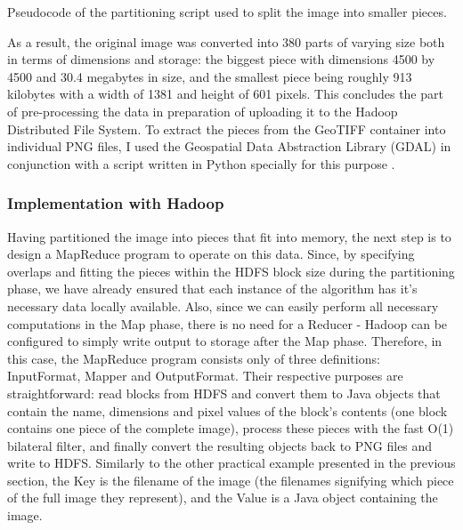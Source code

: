 \documentclass [12pt,a4paper]{report}
\begin{document}
\begin{center}
\begin{algorithm}[H]
\caption{Pseudocode of the partitioning script used to split the image into smaller pieces.}
\label{partitioning_algorithm}
\end{algorithm}
\end{center}

As a result, the original image was converted into 380 parts of varying size both in terms of dimensions and storage: the biggest piece with dimensions 4500 by 4500 and 30.4 megabytes in size, and the smallest piece being roughly 913 kilobytes with a width of 1381 and height of 601 pixels. This concludes the part of pre-processing the data in preparation of uploading it to the Hadoop Distributed File System.
To extract the pieces from the GeoTIFF container into individual PNG files, I used the Geospatial Data Abstraction Library (GDAL) in conjunction with a script written in Python specially for this purpose \cite{gdal}.

\subsubsection{Implementation with Hadoop}

Having partitioned the image into pieces that fit into memory, the next step is to design a MapReduce program to operate on this data. Since, by specifying overlaps and fitting the pieces within the HDFS block size during the partitioning phase, we have already ensured that each instance of the algorithm has it's necessary data locally available. Also, since we can easily perform all necessary computations in the Map phase, there is no need for a Reducer - Hadoop can be configured to simply write output to storage after the Map phase. Therefore, in this case, the MapReduce program consists only of three definitions: InputFormat, Mapper and OutputFormat. Their respective purposes are straightforward: read blocks from HDFS and convert them to Java objects that contain the name, dimensions and pixel values of the block's contents (one block contains one piece of the complete image), process these pieces with the fast O(1) bilateral filter, and finally convert the resulting objects back to PNG files and write to HDFS. Similarly to the other practical example presented in the previous section, the Key is the filename of the image (the filenames signifying which piece of the full image they represent), and the Value is a Java object containing the image.
\end{document}
